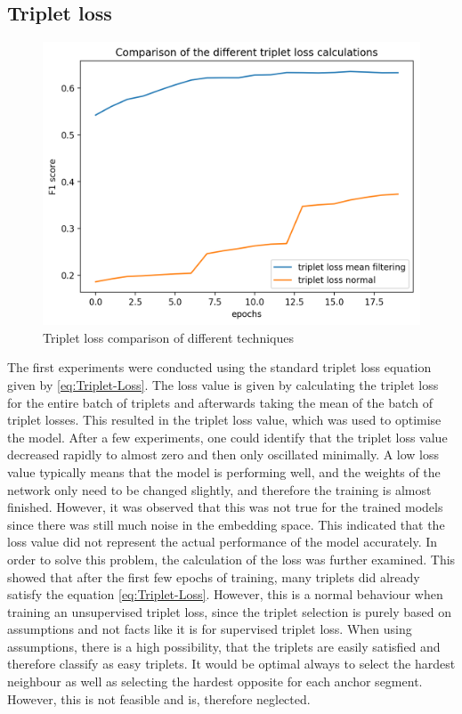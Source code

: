 \subsection{Triplet loss}
\label{sub:Results-Triplet-Loss}
\begin{figure}[htb]
\centering
    \includegraphics[width=0.6\linewidth]{img/Triplet-Loss-Comparison-Techniques.png}
    \caption{Triplet loss comparison of different techniques}
    \label{fig:Triplet-Loss-Techniques}
\end{figure}
\noindent
The first experiments were conducted using the standard triplet loss equation given by \ref{eq:Triplet-Loss}. The loss value is given by calculating the triplet loss for the entire batch of triplets and afterwards taking the mean of the batch of triplet losses. This resulted in the triplet loss value, which was used to optimise the model. After a few experiments, one could identify that the triplet loss value decreased rapidly to almost zero and then only oscillated minimally. A low loss value typically means that the model is performing well, and the weights of the network only need to be changed slightly, and therefore the training is almost finished. However, it was observed that this was not true for the trained models since there was still much noise in the embedding space. This indicated that the loss value did not represent the actual performance of the model accurately.
\newline
\newline
In order to solve this problem, the calculation of the loss was further examined. This showed that after the first few epochs of training, many triplets did already satisfy the equation \ref{eq:Triplet-Loss}. However, this is a normal behaviour when training an unsupervised triplet loss, since the triplet selection is purely based on assumptions and not facts like it is for supervised triplet loss. When using assumptions, there is a high possibility, that the triplets are easily satisfied and therefore classify as easy triplets. It would be optimal always to select the hardest neighbour as well as selecting the hardest opposite for each anchor segment. However, this is not feasible and is, therefore neglected.

